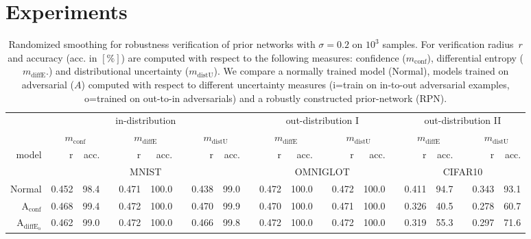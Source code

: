 
\section{Experiments}



\begin{table}[ht]
	\centering
	\caption{Randomized smoothing for robustness verification of prior networks with $\sigma=0.2$ on $10^3$ samples. For verification radius~$r$ and accuracy (acc. in $[\%]$) are computed with respect to the following measures: confidence ($m_{\mathrm{conf}}$), differential entropy ($m_{\mathrm{diffE}}$.) and distributional uncertainty ($m_{\mathrm{distU}}$). We compare a normally trained model (Normal), models trained on adversarial ($A$) computed with respect to different uncertainty measures (i=train on in-to-out adversarial examples, o=trained on out-to-in adversarials) and a robustly constructed prior-network (RPN).}
	\begin{tiny}
		\begin{tabular}{@{}rrrcrrcrrcrrcrrcrrcrr@{}}
			\toprule
			& \multicolumn{8}{c}{in-distribution} &  & \multicolumn{5}{c}{out-distribution I} &   & \multicolumn{5}{c}{out-distribution II} \\
			\cmidrule{2-9} \cmidrule{11-15} \cmidrule{17-21}
			& \multicolumn{2}{c}{$m_{\mathrm{conf}}$} &   & \multicolumn{2}{c}{$m_{\mathrm{diffE}}$} &   & \multicolumn{2}{c}{$m_{\mathrm{distU}}$} &   
			& \multicolumn{2}{c}{$m_{\mathrm{diffE}}$} &   & \multicolumn{2}{c}{$m_{\mathrm{distU}}$} & 
			& \multicolumn{2}{c}{$m_{\mathrm{diffE}}$} &   & \multicolumn{2}{c}{$m_{\mathrm{distU}}$} \\
			\cmidrule{2-3}  \cmidrule{5-6} \cmidrule{8-9} \cmidrule{11-12}  \cmidrule{14-15} \cmidrule{17-18} \cmidrule{20-21}
			model & r & acc. & & r & acc. &  & r & acc. & & r & acc. & & r & acc. & & r & acc. & & r & acc. \\
			\midrule
			& \multicolumn{8}{c}{MNIST} & & \multicolumn{5}{c}{OMNIGLOT} & & \multicolumn{5}{c}{CIFAR10} \\
			Normal                            & 0.452 & 98.4 & & 0.471 & 100.0 & & 0.438 & 99.0 & & 0.472 & 100.0 & & 0.472 & 100.0 & & 0.411 & 94.7 & & 0.343 & 93.1 \\
			$\mathrm{A}_{\mathrm{conf}}$       & 0.468 & 99.4 & & 0.472 & 100.0 & & 0.470 & 99.9 & & 0.470 & 100.0 & & 0.471 & 100.0 & & 0.326 & 40.5 & & 0.278 & 60.7 \\
			$\mathrm{A}_{\mathrm{diffE_{o}}}$  & 0.462 & 99.0 & & 0.472 & 100.0 & & 0.466 & 99.8 & & 0.472 & 100.0 & & 0.472 & 100.0 & & 0.319 & 55.3 & & 0.297 & 71.6 \\

\end{tabular}
\end{tiny}
\end{table}
